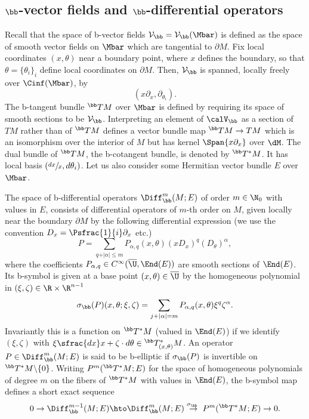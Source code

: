 \subsection{\texorpdfstring{$\bb$}{b}-vector fields and \texorpdfstring{$\bb$}{b}-differential operators} \label{subsec:bvector fields diff ops}
Recall that the space of b\nobreakdash-vector fields $\mathcal{V}_\bb = \mathcal{V}_\bb(\Mbar)$ is defined as the
space of smooth vector fields on $\Mbar$ which are tangential to $\partial M$.
Fix local coordinates $(x,\theta)$ near a boundary point, where $x$ defines the boundary, so that $\theta = \{\theta_i\}_i$ define local coordinates on $\partial M$.
Then, $\mathcal{V}_\bb$ is spanned, locally freely over $\Cinf(\Mbar)$, by
\[
(x\partial_{x}, \partial_{\theta_{i}}).
\]
The b-tangent bundle $^\bb TM$ over $\Mbar$ is defined by requiring its space of smooth sections to be
$\mathcal{V}_\bb$. Interpreting an element of $\calV_\bb$ as a section of $TM$ rather than of $^\bb TM$ defines a vector bundle map $^\bb TM\to TM$ which is an isomorphism over the interior of $M$ but has kernel $\Span\{x\partial_x\}$ over $\dM$. The dual bundle of $^\bb TM$, the b-cotangent bundle, is denoted by $^\bb T^*M$. It has local basis $(\sfrac{dx}x, d\theta_i)$.
Let us also consider some Hermitian vector bundle $E$ over $\Mbar$.

The space of b-differential operators $\Diff^{m}_\bb(M; E)$ of order $m \in \N_0$ with values in $E$,
consists of differential operators of $m$-th order on $M$, given locally near the boundary $\partial M$ by
the following differential expression (we use the convention $D_x = \Psfrac{1}{i}\partial_x$ etc.)%
\begin{equation}\label{b operator}
P = \sum_{q+ \vert \alpha\vert \leq m} P_{\alpha, q}(x,\theta)(xD_{x})^{q}(D_{\theta})^{\alpha},
\end{equation}
where the coefficients $P_{\alpha, q} \in C^\infty (\overline{\U},\End(E))$ are smooth sections of $\End(E)$.
Its b-symbol is given at a base point $(x,\theta) \in \overline{\U}$
by the homogeneous polynomial in $(\xi,\zeta)\in\R\times\R^{n-1}$
\begin{equation*}
\sigma_\bb(P)(x,\theta; \xi,\zeta) = \sum_{j+ \vert \alpha \vert = m} P_{\alpha, q}(x,\theta) \xi^{q}\zeta^{\alpha}.
\end{equation*}
Invariantly this is a function on $^\bb T^*M$ (valued in $\End(E)$) if we identify $(\xi,\zeta)$ with $\xi\sfrac{dx}x+\zeta\cdot d\theta \in {}^\bb T^*_{(x,\theta)}M$. An operator $P \in \Diff^{m}_\bb(M; E)$ is said to be b-elliptic if
$\sigma_\bb(P)$ is invertible on $^\bb T^{*}M \backslash \{0\} $. Writing $P^{m}(^\bb T^{*}M; E)$ for the space of
homogeneous polynomials of degree $m$ on the fibers of $^\bb T^{*}M$ with values in $\End(E)$, the
b-symbol map defines a short exact sequence
\begin{equation}
0 \to \Diff_\bb^{m-1}(M; E) \hto \Diff_\bb^{m}(M; E)
\overset{\sigma_\bb \ }{\to} P^{m}(^\bb T^{*}M; E) \to 0.
\end{equation}

